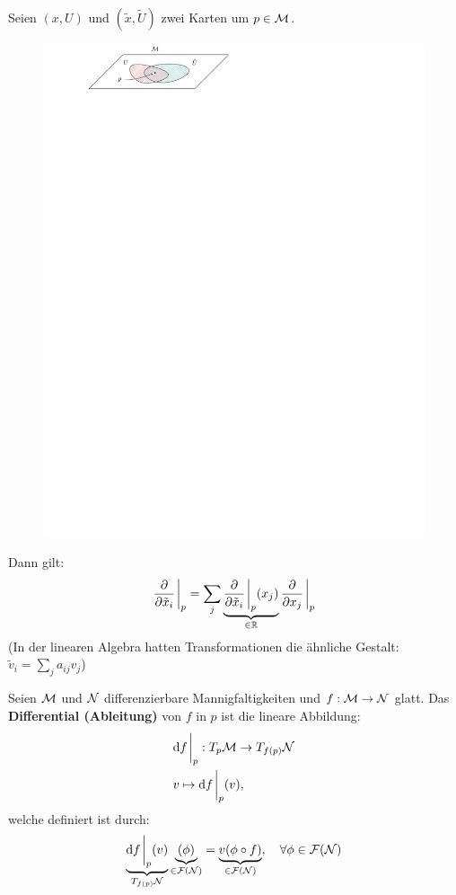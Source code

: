 \begin{satz}[Transformationsregel]
Seien $(x, U)$ und $(\tilde{x}, \tilde{U})$ zwei Karten um $p \in \mathcal{M}$.
\begin{figure}[H]
    \begin{center}
\includegraphics[scale=1.0]{figures/tikz/transformationlaw.pdf}
\label{img:transformationsregel}
\end{center}
\end{figure}  
Dann gilt:
\begin{align}
\pdv{\tilde{x}_i} \eval_p  = \sum_j \underbrace{\pdv{\tilde{x}_i} \eval_p  (x_j)}_{\in \R} \pdv{x_j} \eval_p 
\end{align}
(In der linearen Algebra hatten Transformationen die ähnliche Gestalt: $\tilde{v}_i = \sum_j a_{i j } v_j$)
\end{satz}
\begin{defs}
Seien $\mathcal{M}$ und $\mathcal{N}$ differenzierbare Mannigfaltigkeiten und $f: \mathcal{M} \to \mathcal{N}$ glatt.
Das \textbf{Differential (Ableitung)} von $f$ in $p$ ist die lineare Abbildung:
\begin{align*}
& \dd f \eval_p : \tspace{p} \to T_{f(p)}\mfka \\
& v \mapsto \dd f \eval_p (v),
\end{align*}
welche definiert ist durch:
\begin{align*}
\underbrace{\dd f \eval_p (v)}_{T_{f(p)}\mfka} \underbrace{(\phi)}_{\in \mathcal{F}(\mfka)} = \underbrace{v(\phi \circ f)}_{\in \mathcal{F}(\mfka)}, \quad \forall \phi \in \mathcal{F}(\mfka)
\end{align*}
\end{defs}
